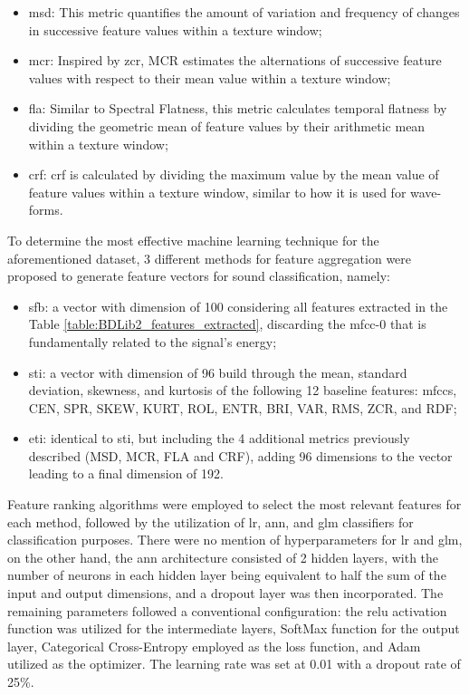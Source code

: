 \begin{itemize}
    \item \gls{msd}: This metric quantifies the amount of variation and frequency of changes in successive feature values within a texture window;
    \item \gls{mcr}: Inspired by \gls{zcr}, MCR estimates the alternations of successive feature values with respect to their mean value within a texture window;
    \item \gls{fla}: Similar to Spectral Flatness, this metric calculates temporal flatness by dividing the geometric mean of feature values by their arithmetic mean within a texture window;
    \item \gls{crf}:  \gls{crf} is calculated by dividing the maximum value by the mean value of feature values within a texture window, similar to how it is used for wave-forms.
\end{itemize}
	
To determine the most effective machine learning technique for the aforementioned dataset, 3 different methods for feature aggregation were proposed to generate feature vectors for sound classification, namely:

\begin{itemize}
    \item \gls{sfb}: a vector with dimension of 100 considering all features extracted in the Table \ref{table:BDLib2_features_extracted}, discarding the \gls{mfcc}-0 that is fundamentally related to the signal's energy;
    \item \gls{sti}: a vector with dimension of 96 build through the mean, standard deviation, skewness, and kurtosis of the following 12 baseline features: \gls{mfcc}s, CEN, SPR, SKEW, KURT, ROL, ENTR, BRI, VAR, RMS, ZCR, and RDF;
    \item \gls{eti}: identical to \gls{sti}, but including the 4 additional metrics previously described (MSD, MCR, FLA and CRF), adding 96 dimensions to the vector leading to a final dimension of 192.
\end{itemize}

Feature ranking algorithms were employed to select the most relevant features for each method, followed by the utilization of \gls{lr}, \gls{ann}, and \gls{glm} classifiers for classification purposes. There were no mention of hyperparameters for \gls{lr} and \gls{glm}, on the other hand, the \gls{ann} architecture consisted of 2 hidden layers, with the number of neurons in each hidden layer being equivalent to half the sum of the input and output dimensions, and a dropout layer was then incorporated. The remaining parameters followed a conventional configuration: the \gls{relu} activation function was utilized for the intermediate layers, SoftMax function for the output layer, Categorical Cross-Entropy employed as the loss function, and Adam utilized as the optimizer. The learning rate was set at 0.01 with a dropout rate of 25\%.

